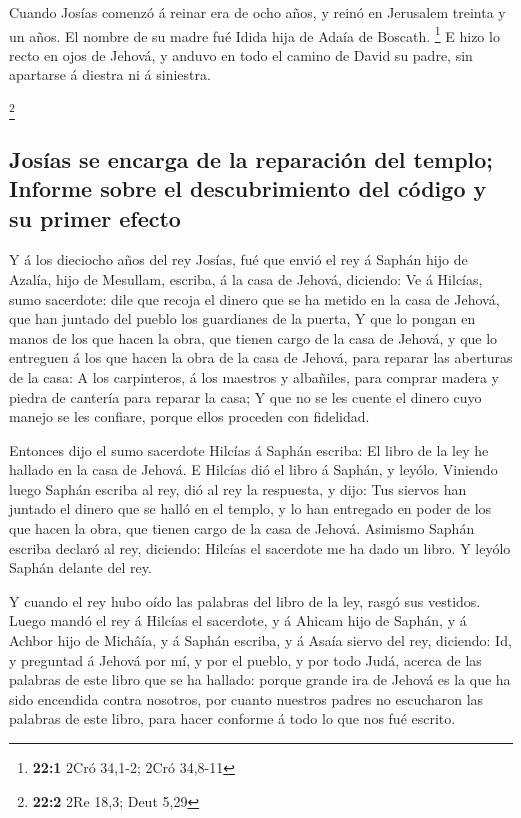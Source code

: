  Cuando Josías comenzó á reinar era de ocho años, y reinó
en Jerusalem treinta y un años. El nombre de su madre fué Idida hija de
Adaía de Boscath. \footnote{\textbf{22:1} 2Cró 34,1-2; 2Cró 34,8-11}
 E hizo lo recto en ojos de Jehová, y anduvo en todo el
camino de David su padre, sin apartarse á diestra ni á siniestra.

\footnote{\textbf{22:2} 2Re 18,3; Deut 5,29}

\hypertarget{josuxedas-se-encarga-de-la-reparaciuxf3n-del-templo-informe-sobre-el-descubrimiento-del-cuxf3digo-y-su-primer-efecto}{%
\subsection{Josías se encarga de la reparación del templo; Informe sobre
el descubrimiento del código y su primer
efecto}\label{josuxedas-se-encarga-de-la-reparaciuxf3n-del-templo-informe-sobre-el-descubrimiento-del-cuxf3digo-y-su-primer-efecto}}

 Y á los dieciocho años del rey Josías, fué que envió el
rey á Saphán hijo de Azalía, hijo de Mesullam, escriba, á la casa de
Jehová, diciendo:  Ve á Hilcías, sumo sacerdote: dile que
recoja el dinero que se ha metido en la casa de Jehová, que han juntado
del pueblo los guardianes de la puerta,  Y que lo pongan
en manos de los que hacen la obra, que tienen cargo de la casa de
Jehová, y que lo entreguen á los que hacen la obra de la casa de Jehová,
para reparar las aberturas de la casa:  A los carpinteros,
á los maestros y albañiles, para comprar madera y piedra de cantería
para reparar la casa;  Y que no se les cuente el dinero
cuyo manejo se les confiare, porque ellos proceden con fidelidad.

 Entonces dijo el sumo sacerdote Hilcías á Saphán escriba:
El libro de la ley he hallado en la casa de Jehová. E Hilcías dió el
libro á Saphán, y leyólo.  Viniendo luego Saphán escriba
al rey, dió al rey la respuesta, y dijo: Tus siervos han juntado el
dinero que se halló en el templo, y lo han entregado en poder de los que
hacen la obra, que tienen cargo de la casa de Jehová. 
Asimismo Saphán escriba declaró al rey, diciendo: Hilcías el sacerdote
me ha dado un libro. Y leyólo Saphán delante del rey.

 Y cuando el rey hubo oído las palabras del libro de la
ley, rasgó sus vestidos.  Luego mandó el rey á Hilcías el
sacerdote, y á Ahicam hijo de Saphán, y á Achbor hijo de Michâía, y á
Saphán escriba, y á Asaía siervo del rey, diciendo:  Id,
y preguntad á Jehová por mí, y por el pueblo, y por todo Judá, acerca de
las palabras de este libro que se ha hallado: porque grande ira de
Jehová es la que ha sido encendida contra nosotros, por cuanto nuestros
padres no escucharon las palabras de este libro, para hacer conforme á
todo lo que nos fué escrito.

